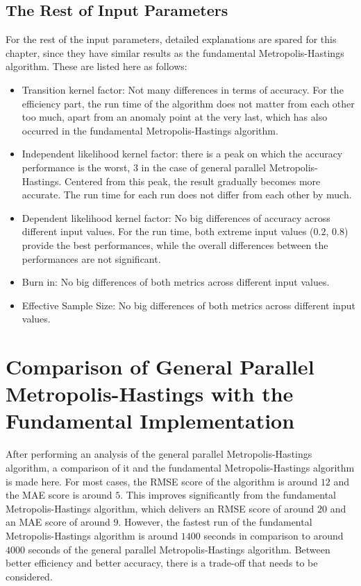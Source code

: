\subsection{The Rest of Input Parameters}
For the rest of the input parameters, detailed explanations are spared for this chapter, since they have similar results as the fundamental Metropolis-Hastings algorithm. These are listed here as follows: 
\begin{itemize}
    \item Transition kernel factor: Not many differences in terms of accuracy. For the efficiency part, the run time of the algorithm does not matter from each other too much, apart from an anomaly point at the very last, which has also occurred in the fundamental Metropolis-Hastings algorithm.
    \item Independent likelihood kernel factor: there is a peak on which the accuracy performance is the worst, $3$ in the case of general parallel Metropolis-Hastings. Centered from this peak, the result gradually becomes more accurate. The run time for each run does not differ from each other by much.
    \item Dependent likelihood kernel factor: No big differences of accuracy across different input values. For the run time, both extreme input values ($0.2$, $0.8$) provide the best performances, while the overall differences between the performances are not significant.
    \item Burn in: No big differences of both metrics across different input values.
    \item Effective Sample Size: No big differences of both metrics across different input values.
\end{itemize}

\section{Comparison of General Parallel Metropolis-Hastings with the Fundamental Implementation}
After performing an analysis of the general parallel Metropolis-Hastings algorithm, a comparison of it and the fundamental Metropolis-Hastings algorithm is made here. For most cases, the RMSE score of the algorithm is around $12$ and the MAE score is around $5$. This improves significantly from the fundamental Metropolis-Hastings algorithm, which delivers an RMSE score of around $20$ and an MAE score of around $9$. However, the fastest run of the fundamental Metropolis-Hastings algorithm is around $1400$ seconds in comparison to around $4000$ seconds of the general parallel Metropolis-Hastings algorithm. Between better efficiency and better accuracy, there is a trade-off that needs to be considered.
